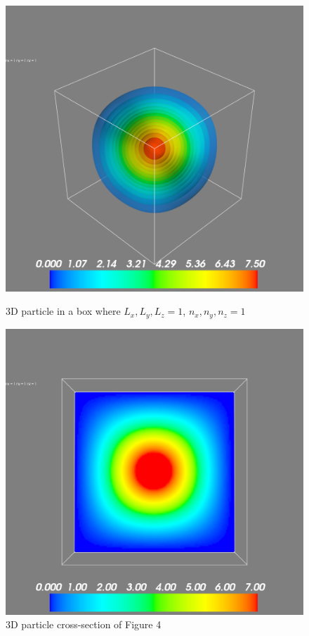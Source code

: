 \documentclass[11pt]{article}
\begin{document}
\begin{figure}[!tbp]
	\centering
	\begin{minipage}[b]{0.4\textwidth}
		\includegraphics[width=\textwidth]{3d111}
		\caption{3D particle in a box where $L_x, L_y, L_z = 1$, $n_x, n_y, n_z = 1$}
	\end{minipage}
	\hfill
	\begin{minipage}[b]{0.4\textwidth}
		\includegraphics[width=\textwidth]{3d111_cross}
		\caption{3D particle cross-section of Figure 4}
	\end{minipage}
\end{figure}
\end{document}
